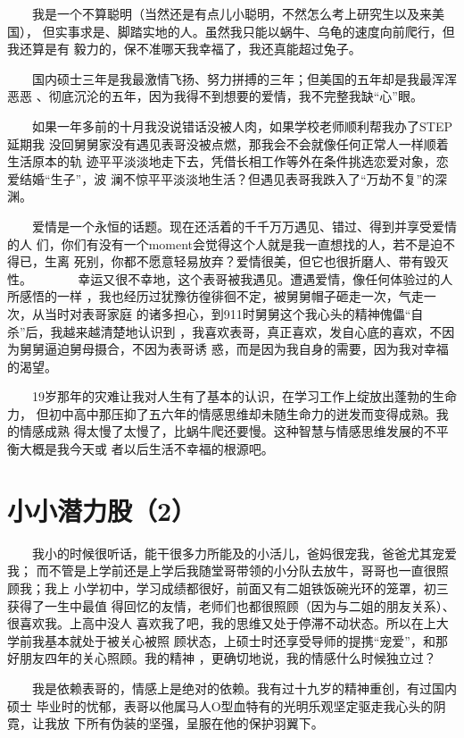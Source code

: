 \documentclass[12pt]{book}
\begin{document}
　　我是一个不算聪明（当然还是有点儿小聪明，不然怎么考上研究生以及来美国），
但实事求是、脚踏实地的人。虽然我只能以蜗牛、乌龟的速度向前爬行，但我还算是有
毅力的，保不准哪天我幸福了，我还真能超过兔子。

　　国内硕士三年是我最激情飞扬、努力拼搏的三年；但美国的五年却是我最浑浑恶恶
、彻底沉沦的五年，因为我得不到想要的爱情，我不完整我缺“心”眼。

　　如果一年多前的十月我没说错话没被人肉，如果学校老师顺利帮我办了STEP延期我
没回舅舅家没有遇见表哥没被点燃，那我会不会就像任何正常人一样顺着生活原本的轨
迹平平淡淡地走下去，凭借长相工作等外在条件挑选恋爱对象，恋爱结婚“生子”，波
澜不惊平平淡淡地生活？但遇见表哥我跌入了“万劫不复”的深渊。

　　爱情是一个永恒的话题。现在还活着的千千万万遇见、错过、得到并享受爱情的人
们，你们有没有一个moment会觉得这个人就是我一直想找的人，若不是迫不得已，生离
死别，你都不愿意轻易放弃？爱情很美，但它也很折磨人、带有毁灭性。
　
　　幸运又很不幸地，这个表哥被我遇见。遭遇爱情，像任何体验过的人所感悟的一样
，我也经历过犹豫彷徨徘徊不定，被舅舅帽子砸走一次，气走一次，从当时对表哥家庭
的诸多担心，到911时舅舅这个我心头的精神傀儡“自杀”后，我越来越清楚地认识到
，我喜欢表哥，真正喜欢，发自心底的喜欢，不因为舅舅逼迫舅母摄合，不因为表哥诱
惑，而是因为我自身的需要，因为我对幸福的渴望。

　　19岁那年的灾难让我对人生有了基本的认识，在学习工作上绽放出蓬勃的生命力，
但初中高中那压抑了五六年的情感思维却未随生命力的迸发而变得成熟。我的情感成熟
得太慢了太慢了，比蜗牛爬还要慢。这种智慧与情感思维发展的不平衡大概是我今天或
者以后生活不幸福的根源吧。
\section{小小潜力股（2）}
\label{sec-8-35}

　　我小的时候很听话，能干很多力所能及的小活儿，爸妈很宠我，爸爸尤其宠爱我；
而不管是上学前还是上学后我随堂哥带领的小分队去放牛，哥哥也一直很照顾我；我上
小学初中，学习成绩都很好，前面又有二姐铁饭碗光环的笼罩，初三获得了一生中最值
得回忆的友情，老师们也都很照顾（因为与二姐的朋友关系）、很喜欢我。上高中没人
喜欢我了吧，我的思维又处于停滞不动状态。所以在上大学前我基本就处于被关心被照
顾状态，上硕士时还享受导师的提携“宠爱”，和那好朋友四年的关心照顾。我的精神
，更确切地说，我的情感什么时候独立过？

　　我是依赖表哥的，情感上是绝对的依赖。我有过十九岁的精神重创，有过国内硕士
毕业时的忧郁，表哥以他属马人O型血特有的光明乐观坚定驱走我心头的阴霓，让我放
下所有伪装的坚强，呈服在他的保护羽翼下。
\end{document}
